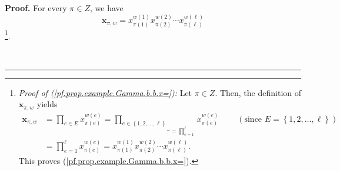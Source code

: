 \documentclass[numbers=enddot,12pt,final,onecolumn,notitlepage,abstracton]{scrartcl}
\theoremstyle{definition}
\newenvironment{proof}[1][Proof]{\noindent\textbf{#1.} }{\ \rule{0.5em}{0.5em}}
\let\prodnonlimits\prod
\renewcommand{\prod}{\prodnonlimits\limits}
\newenvironment{verlong}{}{}
\begin{document}
\begin{verlong}
\begin{footnotesize}
\begin{proof}
For every $\pi\in Z$, we have%
\begin{equation}
\mathbf{x}_{\pi,w}=x_{\pi\left(  1\right)  }^{w\left(  1\right)  }%
x_{\pi\left(  2\right)  }^{w\left(  2\right)  }\cdots x_{\pi\left(
\ell\right)  }^{w\left(  \ell\right)  } \label{pf.prop.example.Gamma.b.b.x=}%
\end{equation}
\footnote{\textit{Proof of (\ref{pf.prop.example.Gamma.b.b.x=}):} Let $\pi\in
Z$. Then, the definition of $\mathbf{x}_{\pi,w}$ yields%
\begin{align*}
{\mathbf{x}}_{\pi,w}  &  =\prod_{e\in E}x_{\pi\left(  e\right)  }^{w\left(
e\right)  } =\underbrace{\prod_{e\in\left\{  1,2,\ldots,\ell\right\}  }%
}_{=\prod_{e=1}^{\ell}}x_{\pi\left(  e\right)  }^{w\left(  e\right)
}\ \ \ \ \ \ \ \ \ \ \left(  \text{since }E=\left\{  1,2,\ldots,\ell\right\}
\right) \\
&  =\prod_{e=1}^{\ell}x_{\pi\left(  e\right)  }^{w\left(  e\right)  }%
=x_{\pi\left(  1\right)  }^{w\left(  1\right)  }x_{\pi\left(  2\right)
}^{w\left(  2\right)  }\cdots x_{\pi\left(  \ell\right)  }^{w\left(
\ell\right)  }.
\end{align*}
This proves (\ref{pf.prop.example.Gamma.b.b.x=}).}.


\end{proof}
\end{footnotesize}
\end{verlong}
\end{document}
